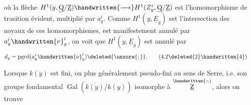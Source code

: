 où la flèche $H^{1}(y,\underline{\mathrm Q}/\underline{\mathrm Z})\handwritten{\longrightarrow}H^{1}(Z^{i}_{y},\underline{\mathrm Q}/\underline{\mathrm Z})$ est l'homomorphisme de trasition évident, multiplié par $a^{i}_{y}$. Comme $H^{1}(y,\underline E_{y})$ est l'intersection des noyaux de ces homomorphismes,  est manifestement annulé par $a^{i}_{y}\handwritten{\nu}^{i}_{y}$, on voit que $H^{1}(y,\underline E_{y})$ est annulé par
\[
  d_{y}=\operatorname{pgcd}(a^{i}_{y}\handwritten{\nu}^{i}_{y})\deleted{\unsure{;}}.
  \tag*{(4.2\deleted{2}\handwritten{4})}
\]

Lorsque $k(y)$ est fini, ou plus généralement pseudo-fini au sens de Serre, i.e. son groupe fondamental $\operatorname{Gal}(\overline{k(y)}/k(y))$ isomorphe à $\overset{\handwritten{\scriptscriptstyle\wedge}}{\underline{\mathrm Z}}$, alors on trouve
\clearpage
